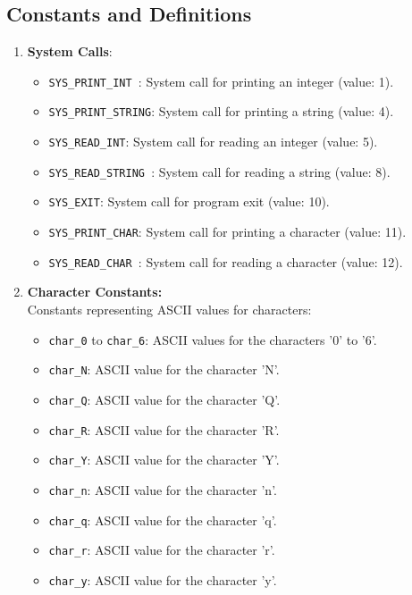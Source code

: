\subsection{Constants and Definitions}
\begin{enumerate}
    \item \textbf{System Calls}:
    \begin{itemize}
        \item \texttt{SYS\_PRINT\_INT  \quad}: System call for printing an integer (value: 1).
        \item \texttt{SYS\_PRINT\_STRING}: System call for printing a string (value: 4).
        \item \texttt{SYS\_READ\_INT\qquad}: System call for reading an integer (value: 5).
        \item \texttt{SYS\_READ\_STRING }: System call for reading a string (value: 8).
        \item \texttt{SYS\_EXIT\qquad\qquad}: System call for program exit (value: 10).
        \item \texttt{SYS\_PRINT\_CHAR\quad}: System call for printing a character (value: 11).
        \item \texttt{SYS\_READ\_CHAR   \quad}: System call for reading a character (value: 12).
    \end{itemize}
    \item \textbf{Character Constants:} \\
    Constants representing ASCII values for characters:
    \begin{itemize}
        \item \texttt{char\_0} to \texttt{char\_6}: ASCII values for the characters '0' to '6'.
        \item \texttt{char\_N}: ASCII value for the character 'N'.
        \item \texttt{char\_Q}: ASCII value for the character 'Q'.
        \item \texttt{char\_R}: ASCII value for the character 'R'.
        \item \texttt{char\_Y}: ASCII value for the character 'Y'.
        \item \texttt{char\_n}: ASCII value for the character 'n'.
        \item \texttt{char\_q}: ASCII value for the character 'q'.
        \item \texttt{char\_r}: ASCII value for the character 'r'.
        \item \texttt{char\_y}: ASCII value for the character 'y'.

\end{itemize}
\end{enumerate}
